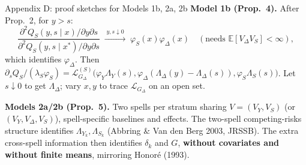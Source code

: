 \documentclass[aspectratio=169,10pt]{beamer}
\newcommand{\E}{\mathbb{E}}
\newcommand{\1}{\mathbf{1}}
\newcommand{\Lap}{\mathcal{L}}
\begin{document}
\begin{frame}{Appendix D: proof sketches for Models 1b, 2a, 2b}
  \small
  \textbf{Model 1b (Prop.~4).} After Prop.~2, for $y>s$:
  \[ \frac{\partial^2Q_S(y,s\mid x)/\partial y\partial s}{\partial^2Q_S(y,s\mid x^*)/\partial y\partial s}\;\xrightarrow{\;y,s\downarrow0\;}\;\varphi_S(x)\varphi_\Delta(x) \quad(\text{needs }\E[V_\Delta V_S]<\infty), \]
  which identifies $\varphi_\Delta$. Then $\partial_sQ_S/(\lambda_S\varphi_S)=\Lap^{(S)}_{G_\Delta}\big(\varphi_Y\Lambda_Y(s),\varphi_\Delta(\Lambda_\Delta(y)-\Lambda_\Delta(s)),\varphi_S\Lambda_S(s)\big)$. Let $s\downarrow0$ to get $\Lambda_\Delta$; vary $x,y$ to trace $\Lap_{G_\Delta}$ on an open set.

  \medskip
  \textbf{Models 2a/2b (Prop.~5).} Two spells per stratum sharing $V=(V_Y,V_S)$ (or $(V_Y,V_\Delta,V_S)$), spell-specific baselines and effects. The two-spell competing-risks structure identifies $\Lambda_{Y_k},\Lambda_{S_k}$ (Abbring \& Van den Berg 2003, JRSSB). The extra cross-spell information then identifies $\delta_k$ and $G$, \textbf{without covariates and without finite means}, mirroring Honoré (1993).
\end{frame}
\end{document}
